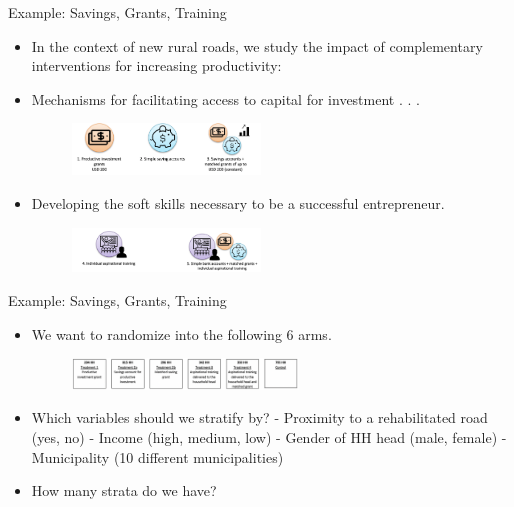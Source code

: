 \documentclass[aspectratio=169]{beamer}
\begin{document}
\begin{frame}{Example: Savings, Grants, Training}

\begin{itemize}[<default overlay specification>]
	\item<1>  In the context of new rural roads, we study the impact of complementary interventions for increasing productivity:
	\item<1>  Mechanisms for facilitating access to capital for investment . . .
	
		\begin{figure}
			\centering
			\includegraphics[width=50mm]{img/Grants}
		\end{figure}
	
	\item<1>  Developing the soft skills necessary to be a successful entrepreneur.
	
		\begin{figure}
			\centering
			\includegraphics[width=50mm]{img/Grants2}
		\end{figure}
	
\end{itemize}
\end{frame}


\begin{frame}{Example: Savings, Grants, Training}

\begin{itemize}[<default overlay specification>]
	\item<1>  We want to randomize into the following 6 arms.
	
	\begin{figure}
		\centering
		\includegraphics[width=60mm]{img/Grants4}
	\end{figure}
	
	\item<1>  Which variables should we stratify by?
			\newline - Proximity to a rehabilitated road (yes, no)
			\newline - Income (high, medium, low)
			\newline - Gender of HH head (male, female)
			\newline - Municipality (10 different municipalities)
	
	\item<1>  How many strata do we have?
	
\end{itemize}
\end{frame}
\end{document}
